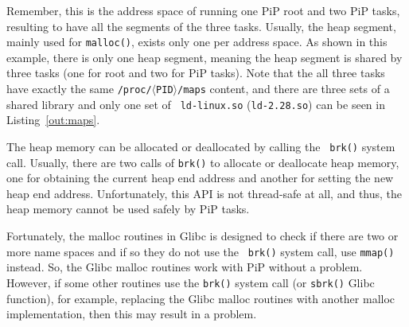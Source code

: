 Remember, this is the address space of running one PiP root and two PiP
tasks, resulting to have all the segments of the three tasks. Usually,
the heap segment, mainly used for {\tt malloc()}, exists only one per
address space. As shown in this example, there is only one heap
segment, meaning the heap segment is shared by three tasks (one for
root and two for PiP tasks). Note that the all three tasks have
exactly the same {\tt /proc/$\langle$PID$\rangle$/maps} content, and
there are three sets of a shared library and only one set of {\tt
  ld-linux.so} ({\tt ld-2.28.so}) can be seen in
Listing~\ref{out:maps}.  

The heap memory can be allocated or deallocated by calling the {\tt
  brk()} system call. Usually, there are two calls of {\tt brk()} to
allocate or deallocate heap memory, one for obtaining the current heap
end address and another for setting the new heap end
address. Unfortunately, this API is not thread-safe at all, and thus,
the heap memory cannot be used safely by PiP tasks.

Fortunately, the malloc routines in Glibc is designed to check if
there are two or more name spaces and if so they do not use the {\tt
  brk()} system call, use {\tt mmap()} instead. So, the Glibc malloc
routines work with PiP without a problem. However, if some other
routines use the {\tt brk()} system call (or {\tt sbrk()} Glibc
function), for example, replacing the Glibc malloc routines with
another malloc implementation, then this may result in a problem. 
